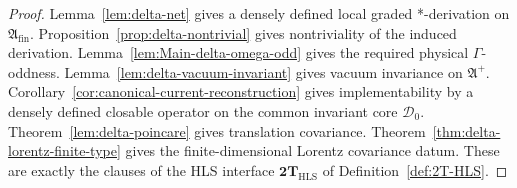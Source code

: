 \begin{proof}
Lemma~\ref{lem:delta-net} gives a densely defined local graded *-derivation on
\(\mathfrak A_{\mathrm{fin}}\).
Proposition~\ref{prop:delta-nontrivial} gives nontriviality of the induced
derivation.
Lemma~\ref{lem:Main-delta-omega-odd} gives the required physical \(\Gamma\)-oddness.
Lemma~\ref{lem:delta-vacuum-invariant} gives vacuum invariance on \(\mathfrak A^{+}\).
Corollary~\ref{cor:canonical-current-reconstruction} gives implementability by a densely
defined closable operator on the common invariant core \(\mathcal D_0\).
Theorem~\ref{lem:delta-poincare} gives translation covariance.
Theorem~\ref{thm:delta-lorentz-finite-type} gives the finite-dimensional Lorentz
covariance datum.
These are exactly the clauses of the HLS interface
\(\mathbf{2T}_{\mathrm{HLS}}\) of Definition~\ref{def:2T-HLS}.
\end{proof}


